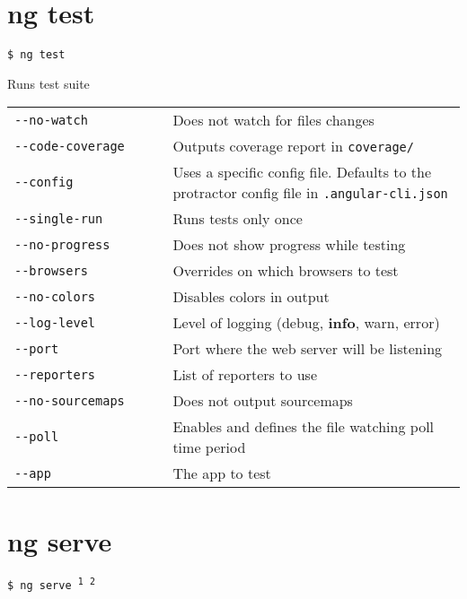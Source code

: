 \documentclass[8pt]{extarticle} %
\begin{document}
\begin{multicols}{3}
\section*{ng test}

  \vspace{1ex}
  {\tt \$ ng test \itt{[options...]}}

  \vspace{0.6ex}

  {\small Runs test suite}

  \vspace{0.6ex}

  \begin{tabular}{L{0.35\linewidth} L{0.65\linewidth}}
    \tt -{}-no-watch  & \small Does not watch for files changes \\
    \tt -{}-code-coverage  & \small Outputs coverage report in {\tt coverage/} \\
    \tt -{}-config  & \small Uses a specific config file. Defaults to the protractor config file in {\tt .angular-cli.json} \\
    \tt -{}-single-run  & \small Runs tests only once \\
    \tt -{}-no-progress  & \small Does not show progress while testing \\
    \tt -{}-browsers  & \small Overrides on which browsers to test \\
    \tt -{}-no-colors  & \small Disables colors in output \\
    \tt -{}-log-level  & \small Level of logging (debug, {\bf info}, warn, error) \\
    \tt -{}-port  & \small Port where the web server will be listening \\
    \tt -{}-reporters  & \small List of reporters to use \\
    \tt -{}-no-sourcemaps  & \small Does not output sourcemaps \\
    \tt -{}-poll  & \small Enables and defines the file watching poll time period \\
    \tt -{}-app  & \small The app to test 
  \end{tabular}

\section*{ng serve}

  \vspace{1ex}
  {\tt \$ ng serve {\small {}\textsuperscript{1} \textsuperscript{2}}}


\end{multicols}
\end{document}
